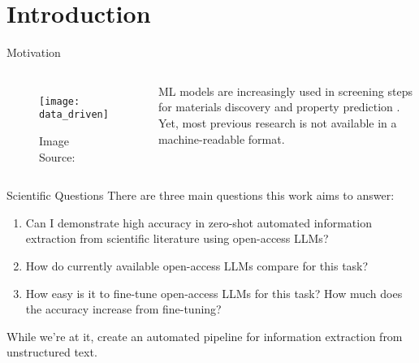 \section{Introduction}

\begin{frame}[c]{Motivation}
    \begin{columns}
    \begin{figure}
        \centering
    \texttt{[image: data\_driven]}
    \caption{
    Image Source: \cite{himanen_datadriven_2019}
    }
    \end{figure}
    \large
    \gls{ML} models are increasingly used in screening steps for materials discovery and property prediction \cite{saal_machine_2020, luo_mof_2022, choudhary_recent_2022}.
    Yet, most previous research is not available in a machine-readable format.
\end{columns}
\end{frame}

\begin{frame}[c]{Scientific Questions}
    \large
    There are three main questions this work aims to answer:
    \begin{enumerate}[<+(1)->]
        \item Can I demonstrate high accuracy in zero-shot automated information extraction from scientific literature using open-access \glspl{LLM}?
        \item How do currently available open-access \glspl{LLM} compare for this task?
        \item How easy is it to fine-tune open-access \glspl{LLM} for this task? How much does the accuracy increase from fine-tuning?
    \end{enumerate}
    \pause
    \vfill
    While we're at it, create an automated pipeline for information extraction from unstructured text.
\end{frame}
